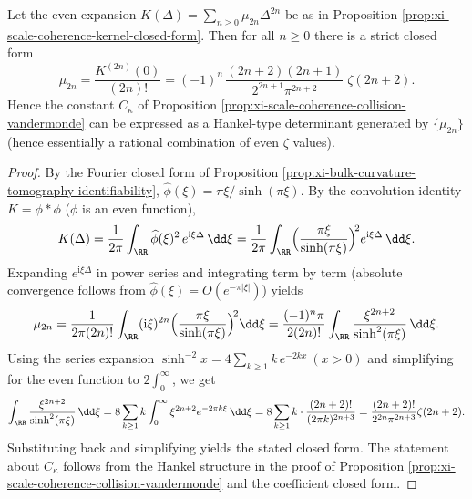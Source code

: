 \begin{proposition}\label{prop:xi-scale-coherence-kernel-zeta-taylor}
Let the even expansion \(K(\Delta)=\sum_{n\ge 0}\mu_{2n}\Delta^{2n}\) be as in Proposition \ref{prop:xi-scale-coherence-kernel-closed-form}.
Then for all \(n\ge 0\) there is a strict closed form
\[
\boxed{\;
\mu_{2n}
=\frac{K^{(2n)}(0)}{(2n)!}
=(-1)^n\,\frac{(2n+2)(2n+1)}{2^{2n+1}\pi^{2n+2}}\;\zeta(2n+2).\;}
\]
Hence the constant \(C_\kappa\) of Proposition \ref{prop:xi-scale-coherence-collision-vandermonde} can be expressed as a Hankel-type determinant generated by \(\{\mu_{2n}\}\) (hence essentially a rational combination of even \(\zeta\) values).
\end{proposition}
\begin{proof}
By the Fourier closed form of Proposition \ref{prop:xi-bulk-curvature-tomography-identifiability},
\(
\widehat\phi(\xi)=\pi\xi/\sinh(\pi\xi)
\).
By the convolution identity \(K=\phi\ast\phi\) (\(\phi\) is an even function),
\[
K(\Delta)=\frac{1}{2\pi}\int_{\RR}\widehat\phi(\xi)^2\,e^{\mathrm{i}\xi\Delta}\,\dd\xi
=\frac{1}{2\pi}\int_{\RR}\Bigl(\frac{\pi\xi}{\sinh(\pi\xi)}\Bigr)^{\!2}e^{\mathrm{i}\xi\Delta}\,\dd\xi.
\]
Expanding \(e^{\mathrm{i}\xi\Delta}\) in power series and integrating term by term (absolute convergence follows from \(\widehat\phi(\xi)=O(e^{-\pi|\xi|})\)) yields
\[
\mu_{2n}
=\frac{1}{2\pi(2n)!}\int_{\RR}(\mathrm{i}\xi)^{2n}\Bigl(\frac{\pi\xi}{\sinh(\pi\xi)}\Bigr)^{\!2}\dd\xi
=\frac{(-1)^n\pi}{2(2n)!}\int_{\RR}\frac{\xi^{2n+2}}{\sinh^2(\pi\xi)}\,\dd\xi.
\]
Using the series expansion
\(
\sinh^{-2}x=4\sum_{k\ge 1}k\,e^{-2kx}\ (x>0)
\)
and simplifying for the even function to \(2\int_0^\infty\), we get
\[
\int_{\RR}\frac{\xi^{2n+2}}{\sinh^2(\pi\xi)}\,\dd\xi
=8\sum_{k\ge 1}k\int_0^\infty \xi^{2n+2}e^{-2\pi k\xi}\,\dd\xi
=8\sum_{k\ge 1}k\cdot\frac{(2n+2)!}{(2\pi k)^{2n+3}}
=\frac{(2n+2)!}{2^{2n}\pi^{2n+3}}\zeta(2n+2).
\]
Substituting back and simplifying yields the stated closed form.
The statement about \(C_\kappa\) follows from the Hankel structure in the proof of Proposition \ref{prop:xi-scale-coherence-collision-vandermonde} and the coefficient closed form.
\end{proof}

